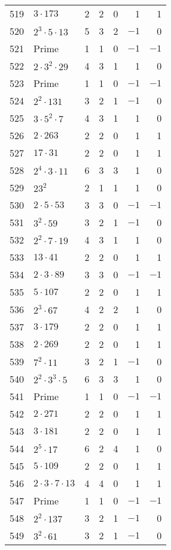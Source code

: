 \documentclass[12pt]{article}
\begin{document}
\begin{tabular}{|r|l|r|r|r|r|r|}
519 & $3 \cdot 173$ & 2 & 2 & 0 & 1 & 1 \\
520 & $2^3 \cdot 5 \cdot 13$ & 5 & 3 & 2 & $-1$ & 0 \\
521 & Prime & 1 & 1 & 0 & $-1$ & $-1$ \\
522 & $2 \cdot 3^2 \cdot 29$ & 4 & 3 & 1 & 1 & 0 \\
523 & Prime & 1 & 1 & 0 & $-1$ & $-1$ \\
524 & $2^2 \cdot 131$ & 3 & 2 & 1 & $-1$ & 0 \\
525 & $3 \cdot 5^2 \cdot 7$ & 4 & 3 & 1 & 1 & 0 \\
526 & $2 \cdot 263$ & 2 & 2 & 0 & 1 & 1 \\
527 & $17 \cdot 31$ & 2 & 2 & 0 & 1 & 1 \\
528 & $2^4 \cdot 3 \cdot 11$ & 6 & 3 & 3 & 1 & 0 \\
529 & $23^2$ & 2 & 1 & 1 & 1 & 0 \\
530 & $2 \cdot 5 \cdot 53$ & 3 & 3 & 0 & $-1$ & $-1$ \\
531 & $3^2 \cdot 59$ & 3 & 2 & 1 & $-1$ & 0 \\
532 & $2^2 \cdot 7 \cdot 19$ & 4 & 3 & 1 & 1 & 0 \\
533 & $13 \cdot 41$ & 2 & 2 & 0 & 1 & 1 \\
534 & $2 \cdot 3 \cdot 89$ & 3 & 3 & 0 & $-1$ & $-1$ \\
535 & $5 \cdot 107$ & 2 & 2 & 0 & 1 & 1 \\
536 & $2^3 \cdot 67$ & 4 & 2 & 2 & 1 & 0 \\
537 & $3 \cdot 179$ & 2 & 2 & 0 & 1 & 1 \\
538 & $2 \cdot 269$ & 2 & 2 & 0 & 1 & 1 \\
539 & $7^2 \cdot 11$ & 3 & 2 & 1 & $-1$ & 0 \\
540 & $2^2 \cdot 3^3 \cdot 5$ & 6 & 3 & 3 & 1 & 0 \\
541 & Prime & 1 & 1 & 0 & $-1$ & $-1$ \\
542 & $2 \cdot 271$ & 2 & 2 & 0 & 1 & 1 \\
543 & $3 \cdot 181$ & 2 & 2 & 0 & 1 & 1 \\
544 & $2^5 \cdot 17$ & 6 & 2 & 4 & 1 & 0 \\
545 & $5 \cdot 109$ & 2 & 2 & 0 & 1 & 1 \\
546 & $2 \cdot 3 \cdot 7 \cdot 13$ & 4 & 4 & 0 & 1 & 1 \\
547 & Prime & 1 & 1 & 0 & $-1$ & $-1$ \\
548 & $2^2 \cdot 137$ & 3 & 2 & 1 & $-1$ & 0 \\
549 & $3^2 \cdot 61$ & 3 & 2 & 1 & $-1$ & 0 \\

\end{tabular}
\end{document}
